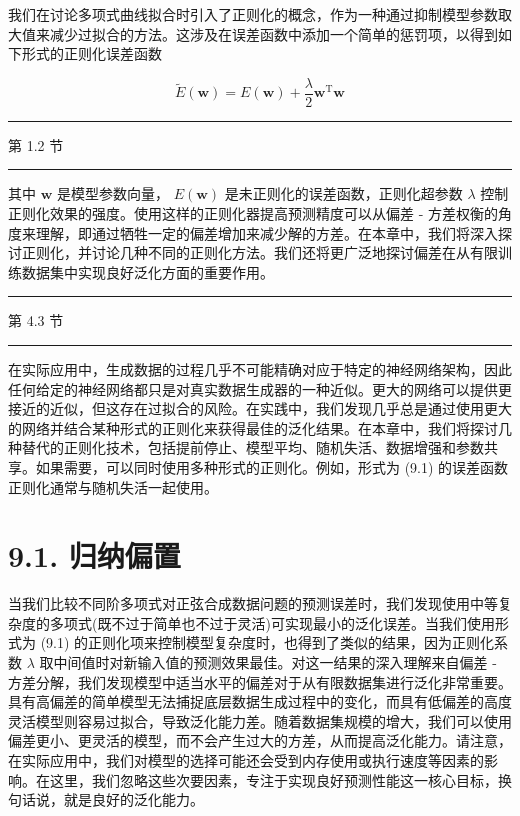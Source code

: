 \documentclass[10pt]{article}
\newcommand{\HRule}{\begin{center}\rule{0.9\linewidth}{0.2mm}\end{center}}
\begin{document}
我们在讨论多项式曲线拟合时引入了正则化的概念，作为一种通过抑制模型参数取大值来减少过拟合的方法。这涉及在误差函数中添加一个简单的惩罚项，以得到如下形式的正则化误差函数

\[
\widetilde{E}\left( \mathbf{w}\right)  = E\left( \mathbf{w}\right)  + \frac{\lambda }{2}{\mathbf{w}}^{\mathrm{T}}\mathbf{w} \tag{9.1}
\]

\HRule

第 1.2 节

\HRule

其中 \(\mathbf{w}\) 是模型参数向量， \(E\left( \mathbf{w}\right)\) 是未正则化的误差函数，正则化超参数 \(\lambda\) 控制正则化效果的强度。使用这样的正则化器提高预测精度可以从偏差 - 方差权衡的角度来理解，即通过牺牲一定的偏差增加来减少解的方差。在本章中，我们将深入探讨正则化，并讨论几种不同的正则化方法。我们还将更广泛地探讨偏差在从有限训练数据集中实现良好泛化方面的重要作用。

\HRule

第 4.3 节

\HRule

在实际应用中，生成数据的过程几乎不可能精确对应于特定的神经网络架构，因此任何给定的神经网络都只是对真实数据生成器的一种近似。更大的网络可以提供更接近的近似，但这存在过拟合的风险。在实践中，我们发现几乎总是通过使用更大的网络并结合某种形式的正则化来获得最佳的泛化结果。在本章中，我们将探讨几种替代的正则化技术，包括提前停止、模型平均、随机失活、数据增强和参数共享。如果需要，可以同时使用多种形式的正则化。例如，形式为 (9.1) 的误差函数正则化通常与随机失活一起使用。

\section*{9.1. 归纳偏置}

当我们比较不同阶多项式对正弦合成数据问题的预测误差时，我们发现使用中等复杂度的多项式(既不过于简单也不过于灵活)可实现最小的泛化误差。当我们使用形式为 (9.1) 的正则化项来控制模型复杂度时，也得到了类似的结果，因为正则化系数 \(\lambda\) 取中间值时对新输入值的预测效果最佳。对这一结果的深入理解来自偏差 - 方差分解，我们发现模型中适当水平的偏差对于从有限数据集进行泛化非常重要。具有高偏差的简单模型无法捕捉底层数据生成过程中的变化，而具有低偏差的高度灵活模型则容易过拟合，导致泛化能力差。随着数据集规模的增大，我们可以使用偏差更小、更灵活的模型，而不会产生过大的方差，从而提高泛化能力。请注意，在实际应用中，我们对模型的选择可能还会受到内存使用或执行速度等因素的影响。在这里，我们忽略这些次要因素，专注于实现良好预测性能这一核心目标，换句话说，就是良好的泛化能力。
\end{document}
